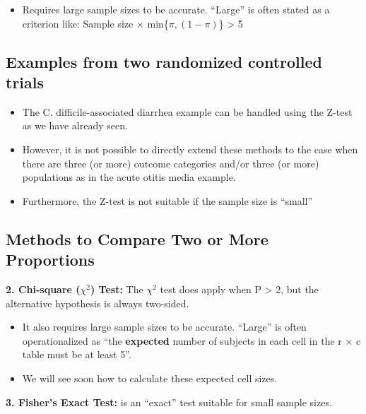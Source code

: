 \documentclass[
]{book}
\providecommand{\tightlist}{%
  \setlength{\itemsep}{0pt}\setlength{\parskip}{0pt}}
\begin{document}
\begin{itemize}
\tightlist
\item
  Requires large sample sizes to be accurate. ``Large'' is often stated as a criterion like: Sample size × min\{\(\pi,(1-\pi)\)\} \textgreater{} 5
\end{itemize}

\hypertarget{examples-from-two-randomized-controlled-trials-1}{%
\subsection{Examples from two randomized controlled trials}\label{examples-from-two-randomized-controlled-trials-1}}

\begin{itemize}
\tightlist
\item
  The C. difficile-associated diarrhea example can be handled using the Z-test as we have already seen.
\item
  However, it is not possible to directly extend these methods to the case when there are three (or more) outcome categories and/or three (or more) populations as in the acute otitis media example.
\item
  Furthermore, the Z-test is not suitable if the sample size is ``small''
\end{itemize}

\hypertarget{methods-to-compare-two-or-more-proportions-1}{%
\subsection{Methods to Compare Two or More Proportions}\label{methods-to-compare-two-or-more-proportions-1}}

\textbf{2. Chi-square (\(\chi^2\)) Test:} The \(\chi^2\) test does apply when P \textgreater{} 2, but the alternative hypothesis is always two-sided.

\begin{itemize}
\tightlist
\item
  It also requires large sample sizes to be accurate. ``Large'' is often operationalized as ``the \textbf{expected} number of subjects in each cell in the r × c table must be at least 5''.
\item
  We will see soon how to calculate these expected cell sizes.
\end{itemize}

\textbf{3. Fisher's Exact Test:} is an ``exact'' test suitable for small sample sizes.
\end{document}
